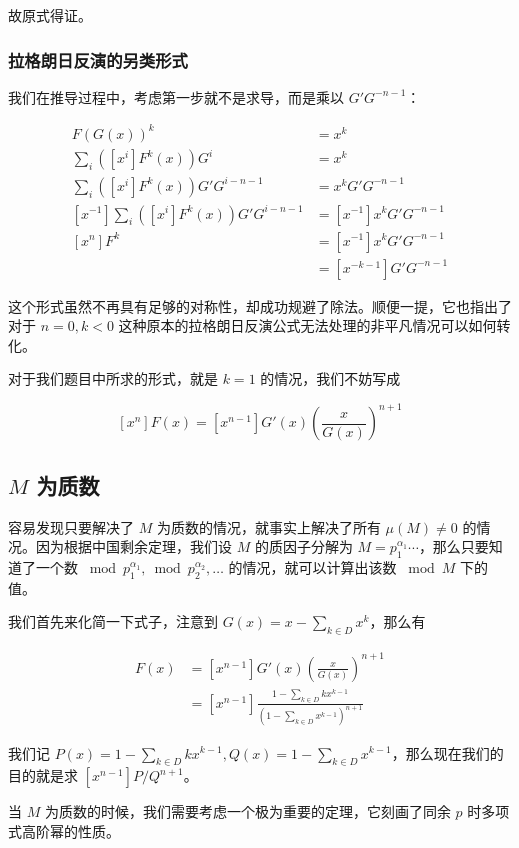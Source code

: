 \documentclass[12pt]{ctexart}
\theoremstyle{theorem}
\theoremstyle{theorem}
\begin{document}
故原式得证。

\subsubsection{拉格朗日反演的另类形式}\label{lagr}

我们在推导过程中，考虑第一步就不是求导，而是乘以 $G'G^{-n-1}$：

\begin{align*}
F(G(x))^k &= x^k\\
\sum_i ([x^i]F^k(x))G^i &= x^k\\
\sum_i ([x^i]F^k(x))G'G^{i-n-1} &= x^k G'G^{-n-1}\\
[x^{-1}]\sum_i ([x^i]F^k(x))G'G^{i-n-1} &= [x^{-1}]x^k G'G^{-n-1}\\
[x^n]F^k &= [x^{-1}]x^k G'G^{-n-1}\\
&= [x^{-k-1}]G'G^{-n-1}
\end{align*}

这个形式虽然不再具有足够的对称性，却成功规避了除法。顺便一提，它也指出了对于 $n=0,k<0$ 这种原本的拉格朗日反演公式无法处理的非平凡情况可以如何转化。

对于我们题目中所求的形式，就是 $k=1$ 的情况，我们不妨写成

$$
[x^n]F(x) = [x^{n-1}]G'(x)\left(\frac {x}{G(x)}\right)^{n+1}
$$

\subsection{$M$ 为质数}

容易发现只要解决了 $M$ 为质数的情况，就事实上解决了所有 $\mu(M) \neq0 $ 的情况。因为根据中国剩余定理，我们设 $M$ 的质因子分解为 $M=p_1^{\alpha_1} \cdots$，那么只要知道了一个数 $\bmod p_1^{\alpha_1}, \bmod p_2^{\alpha_2},\dots$ 的情况，就可以计算出该数 $\bmod M$ 下的值。

我们首先来化简一下式子，注意到 $G(x)= x-\sum_{k\in D}x^k$，那么有

\begin{align*}
[x^n]F(x) &=[x^{n-1}] G'(x)\left(\frac {x}{G(x)}\right)^{n+1}\\
&= [x^{n-1}] \frac{1-\sum_{k\in D} kx^{k-1}}{(1-\sum_{k\in D} x^{k-1})^{n+1}}
\end{align*}

我们记 $P(x)=1-\sum_{k\in D} kx^{k-1}, Q(x)=1-\sum_{k\in D} x^{k-1}$，那么现在我们的目的就是求 $[x^{n-1}] P/Q^{n+1}$。

当 $M$ 为质数的时候，我们需要考虑一个极为重要的定理，它刻画了同余 $p$ 时多项式高阶幂的性质。
\end{document}
